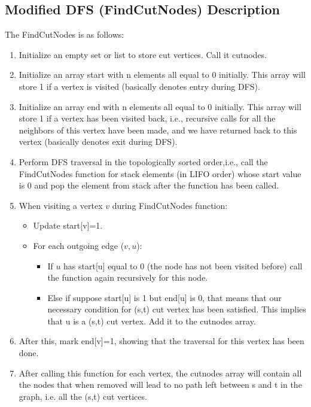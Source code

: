 \documentclass{article}
\begin{document}
    \subsection{Modified DFS (FindCutNodes) Description}
    The FindCutNodes is as follows:
        \begin{enumerate}
            \item Initialize an empty set or list to store cut vertices. Call it cutnodes.
            \item Initialize an array start with n elements all equal to 0 initially. This array will store 1 if a vertex is visited (basically denotes entry during DFS).
            \item Initialize an array end with n elements all equal to 0 initially. This array will store 1 if a vertex has been visited back, i.e., recursive calls for all the neighbors of this vertex have been made, and we have returned back to this vertex (basically denotes exit during DFS).
            \item Perform DFS traversal in the topologically sorted order,i.e., call the FindCutNodes function for stack elements (in LIFO order) whose start value is 0 and pop the element from stack after the function has been called.
            \item When visiting a vertex $v$ during FindCutNodes function:
            \begin{itemize}
                \item Update start[v]=1.
                \item For each outgoing edge ($v, u$):
                \begin{itemize}
                    \item If $u$ has start[u] equal to 0 (the node has not been visited before) call the function again recursively for this node.
                    \item Else if suppose start[u] is 1 but end[u] is 0, that means that our necessary condition for (s,t) cut vertex has been satisfied. This implies that u is a (s,t) cut vertex. Add it to the cutnodes array.
                \end{itemize}
            \end{itemize}
            \item After this, mark end[v]=1, showing that the traversal for this vertex has been done.
            \item After calling this function for each vertex, the cutnodes array will contain all the nodes that when removed will lead to no path left between s and t in the graph, i.e. all the (s,t) cut vertices.
        \end{enumerate}
\end{document}
